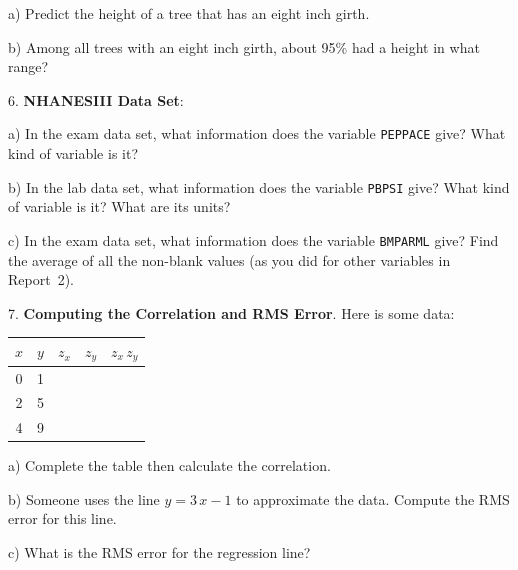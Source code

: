 \documentclass[10pt]{article}
\begin{document}
\hspace{10pt} a) Predict the height of a tree that has an eight inch girth.
\vspace{.5in}

\hspace{10pt} b) Among all trees with an eight inch girth, about 95\% had a height in what range?
\vspace{1in}

6. \textbf{NHANESIII Data Set}:

\hspace{10pt} a) In the exam data set, what information does the variable \texttt{PEPPACE} give?
What kind of variable is it?
\vspace{.25in}


\hspace{10pt} b) In the lab data set, what information does the variable \texttt{PBPSI} give?
What kind of variable is it?  What are its units?
\vspace{.4in}

\hspace{10pt} c) In the exam data set, what information does the variable \texttt{BMPARML} give?
Find the average of all the non-blank values (as you did for other variables in Report~2).

\vfill
\eject
    
7. \textbf{Computing the Correlation and RMS Error}.
Here is some data:
\begin{center}
{\setlength{\tabcolsep}{40pt}\begin{tabular}{cc|cc|c}
$x$ & $y$ & $z_x$ & $z_y$ & $z_x\,z_y$\\[2pt]\hline
0   & 1 & & &\vphantom{\LARGE Y}\\[20pt]
2   & 5 & & & \\[20pt]
4   & 9 & & &\\[20pt]
\end{tabular}}
\end{center}
\hspace{10pt} a) Complete the table then calculate the correlation.
\vspace{1.5in}

\hspace{10pt} b) Someone uses the line $y=3\,x - 1$ to approximate the data.
Compute the RMS error for this line.
\vspace{1.5in}

\hspace{10pt} c) What is the RMS error for the regression line?
\end{document}
